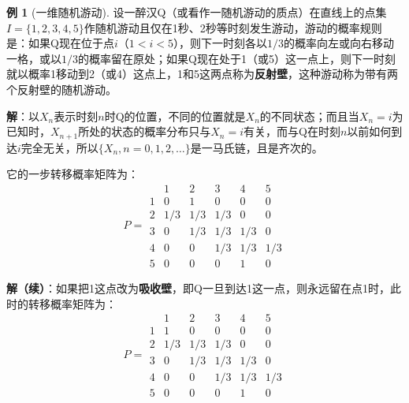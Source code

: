 \documentclass[11pt,a4paper]{report}
\theoremstyle{definition}
\newtheorem{example}{例}[chapter]
\begin{document}
\begin{example}[一维随机游动]
设一醉汉Q（或看作一随机游动的质点）在直线上的点集$I=\{1,2,3,4,5\}$作随机游动且仅在1秒、2秒等时刻发生游动，游动的概率规则是：如果Q现在位于点$i$（$1<i<5$），则下一时刻各以$1/3$的概率向左或向右移动一格，或以$1/3$的概率留在原处；如果Q现在处于1（或5）这一点上，则下一时刻就以概率1移动到2（或4）这点上，1和5这两点称为\textbf{反射壁}，这种游动称为带有两个反射壁的随机游动。

\textbf{解}：以$X_n$表示时刻$n$时Q的位置，不同的位置就是$X_n$的不同状态；而且当$X_n=i$为已知时，$X_{n+1}$所处的状态的概率分布只与$X_n=i$有关，而与Q在时刻$n$以前如何到达$i$完全无关，所以$\{X_n,n=0,1,2,\ldots\}$是一马氏链，且是齐次的。

它的一步转移概率矩阵为：
\[
P=
\begin{matrix}
 & 1 & 2 & 3 & 4 & 5\\
1 & 0 & 1 & 0 & 0 & 0\\
2 & 1/3 & 1/3 & 1/3 & 0 & 0\\
3 & 0 & 1/3 & 1/3 & 1/3 & 0\\
4 & 0 & 0 & 1/3 & 1/3 & 1/3\\
5 & 0 & 0 & 0 & 1 & 0
\end{matrix}
\]

\textbf{解（续）}：如果把1这点改为\textbf{吸收壁}，即Q一旦到达1这一点，则永远留在点1时，此时的转移概率矩阵为：
\[
P=
\begin{matrix}
 & 1 & 2 & 3 & 4 & 5\\
1 & 1 & 0 & 0 & 0 & 0\\
2 & 1/3 & 1/3 & 1/3 & 0 & 0\\
3 & 0 & 1/3 & 1/3 & 1/3 & 0\\
4 & 0 & 0 & 1/3 & 1/3 & 1/3\\
5 & 0 & 0 & 0 & 1 & 0
\end{matrix}
\]
\end{example}
\end{document}
